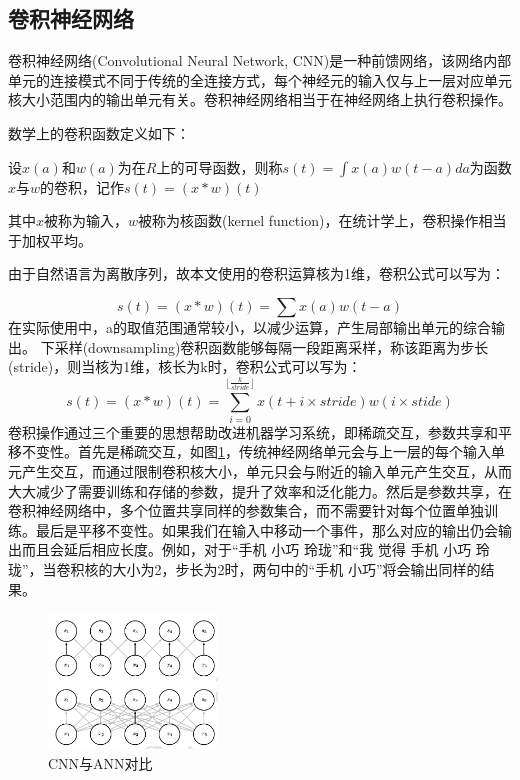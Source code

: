 \subsection{卷积神经网络}
卷积神经网络(Convolutional Neural Network, CNN)是一种前馈网络，该网络内部单元的连接模式不同于传统的全连接方式，每个神经元的输入仅与上一层对应单元核大小范围内的输出单元有关。卷积神经网络相当于在神经网络上执行卷积操作。\par
数学上的卷积函数定义如下：\par
设$x(a)$和$w(a)$为在$R$上的可导函数，则称$s(t) = \int x(a)w(t-a)da$为函数$x$与$w$的卷积，记作$s(t) = (x * w)(t)$\par
其中$x$被称为输入，$w$被称为核函数(kernel function)，在统计学上，卷积操作相当于加权平均。\par
由于自然语言为离散序列，故本文使用的卷积运算核为1维，卷积公式可以写为：\par
\begin{equation}
s(t) = (x * w)(t) = \sum x(a)w(t -a)
\end{equation}
在实际使用中，a的取值范围通常较小，以减少运算，产生局部输出单元的综合输出。
下采样(downsampling)卷积函数能够每隔一段距离采样，称该距离为步长(stride)，则当核为1维，核长为k时，卷积公式可以写为：
\begin{equation}
s(t) = (x * w)(t) = \sum_{i = 0}^{\lfloor{\frac{k}{stride}}\rfloor}{x(t + i \times stride)w(i \times stide)}
\end{equation}
卷积操作通过三个重要的思想帮助改进机器学习系统，即稀疏交互，参数共享和平移不变性\cite{deeplearning2016}。首先是稀疏交互，如图\ref{cnn1}，传统神经网络单元会与上一层的每个输入单元产生交互，而通过限制卷积核大小，单元只会与附近的输入单元产生交互，从而大大减少了需要训练和存储的参数，提升了效率和泛化能力。然后是参数共享，在卷积神经网络中，多个位置共享同样的参数集合，而不需要针对每个位置单独训练。最后是平移不变性。如果我们在输入中移动一个事件，那么对应的输出仍会输出而且会延后相应长度。例如，对于“手机 小巧 玲珑”和“我 觉得 手机 小巧 玲珑”，当卷积核的大小为2，步长为2时，两句中的“手机 小巧”将会输出同样的结果。

\begin{figure}[!hbp]
\begin{center}
\includegraphics[width=0.4\textwidth]{graphic/cnn1.png}
\caption{CNN与ANN对比\cite{deeplearning2016} \label{cnn1}}
\end{center}
\end{figure}

